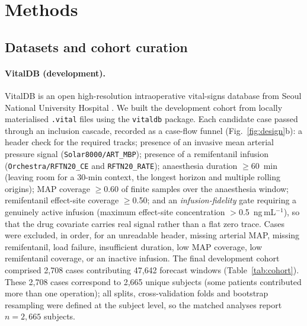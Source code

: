 \documentclass[11pt]{article}
\begin{document}
\section{Methods}

\subsection{Datasets and cohort curation}

\paragraph{VitalDB (development).} VitalDB is an open high-resolution
intraoperative vital-signs database from Seoul National University Hospital
\citep{Lee2022,VitalDBPhysioNet2022}. We built the development cohort from
locally materialised \texttt{.vital} files using the \texttt{vitaldb}
package. Each candidate case passed through an inclusion cascade, recorded as
a case-flow funnel (Fig.~\ref{fig:design}b): a header check for the required
tracks; presence of an invasive mean arterial pressure signal
(\texttt{Solar8000/\allowbreak ART\_MBP}); presence of a remifentanil infusion
(\texttt{Orchestra/\allowbreak RFTN20\_CE} and \texttt{RFTN20\_RATE}); anaesthesia
duration $\geq$60~min (leaving room for a 30-min context, the longest
horizon and multiple rolling origins); MAP coverage $\geq$0.60 of finite
samples over the anaesthesia window; remifentanil effect-site coverage
$\geq$0.50; and an \emph{infusion-fidelity} gate requiring a genuinely active
infusion (maximum effect-site concentration $>$0.5~ng\,mL$^{-1}$), so that
the drug covariate carries real signal rather than a flat zero trace. Cases
were excluded, in order, for an unreadable header, missing arterial MAP,
missing remifentanil, load failure, insufficient duration, low MAP coverage,
low remifentanil coverage, or an inactive infusion. The final development
cohort comprised 2{,}708 cases contributing 47{,}642 forecast windows
(Table~\ref{tab:cohort}). These 2{,}708 cases correspond to 2{,}665 unique
subjects (some patients contributed more than one operation); all splits,
cross-validation folds and bootstrap resampling were defined at the subject
level, so the matched analyses report $n=2{,}665$ subjects.
\end{document}

